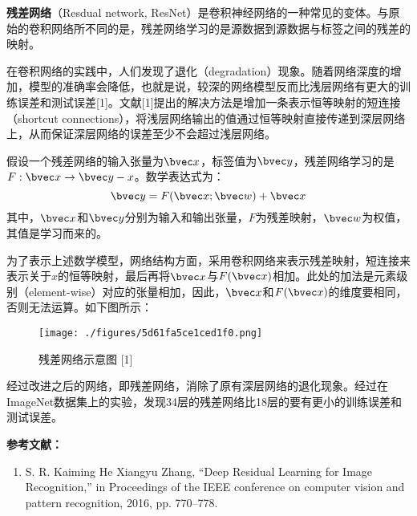 
\textbf{残差网络}（Resdual network, ResNet）是卷积神经网络的一种常见的变体。与原始的卷积网络所不同的是，残差网络学习的是源数据到源数据与标签之间的残差的映射。

在卷积网络的实践中，人们发现了退化（degradation）现象。随着网络深度的增加，模型的准确率会降低，也就是说，较深的网络模型反而比浅层网络有更大的训练误差和测试误差[1]。文献[1]提出的解决方法是增加一条表示恒等映射的短连接（shortcut connections），将浅层网络输出的值通过恒等映射直接传递到深层网络上，从而保证深层网络的误差至少不会超过浅层网络。

假设一个残差网络的输入张量为$\bvec x$，标签值为$\bvec y$，残差网络学习的是$F: \bvec x \rightarrow \bvec y-x$。数学表达式为：
\begin{equation}
\bvec y=F(\bvec  x;\bvec  w)+\bvec x
\end{equation}
其中，$\bvec x$和$\bvec y$分别为输入和输出张量，$F$为残差映射，$\bvec w$为权值，其值是学习而来的。

为了表示上述数学模型，网络结构方面，采用卷积网络来表示残差映射，短连接来表示关于$x$的恒等映射，最后再将$\bvec x$与$F(\bvec x)$相加。此处的加法是元素级别（element-wise）对应的张量相加，因此，$\bvec x$和$F(\bvec x)$的维度要相同，否则无法运算。如下图所示：
\begin{figure}[ht]
\centering
\texttt{[image: ./figures/5d61fa5ce1ced1f0.png]}
\caption{残差网络示意图 [1]} \label{fig_ResNet}
\end{figure}

经过改进之后的网络，即残差网络，消除了原有深层网络的退化现象。经过在ImageNet数据集上的实验，发现34层的残差网络比18层的要有更小的训练误差和测试误差。


\textbf{参考文献：}
\begin{enumerate}
\item S. R. Kaiming He Xiangyu Zhang, “Deep Residual Learning for Image Recognition,” in Proceedings of the IEEE conference on computer vision and pattern recognition, 2016, pp. 770–778.
\end{enumerate}